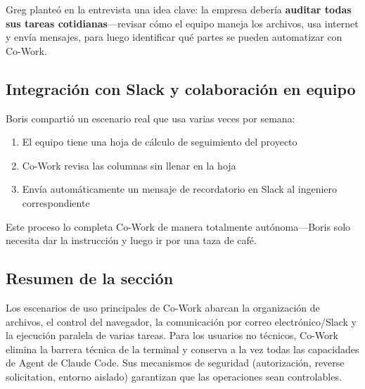 Greg planteó en la entrevista una idea clave: la empresa debería \textbf{auditar todas sus tareas cotidianas}—revisar cómo el equipo maneja los archivos, usa internet y envía mensajes, para luego identificar qué partes se pueden automatizar con Co-Work.

\subsection{Integración con Slack y colaboración en equipo}

Boris compartió un escenario real que usa varias veces por semana:

\begin{enumerate}
    \item El equipo tiene una hoja de cálculo de seguimiento del proyecto
    \item Co-Work revisa las columnas sin llenar en la hoja
    \item Envía automáticamente un mensaje de recordatorio en Slack al ingeniero correspondiente
\end{enumerate}

Este proceso lo completa Co-Work de manera totalmente autónoma—Boris solo necesita dar la instrucción y luego ir por una taza de café.

\subsection{Resumen de la sección}

Los escenarios de uso principales de Co-Work abarcan la organización de archivos, el control del navegador, la comunicación por correo electrónico/Slack y la ejecución paralela de varias tareas. Para los usuarios no técnicos, Co-Work elimina la barrera técnica de la terminal y conserva a la vez todas las capacidades de Agent de Claude Code. Sus mecanismos de seguridad (autorización, reverse solicitation, entorno aislado) garantizan que las operaciones sean controlables.

